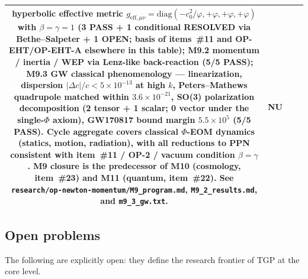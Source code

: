 \documentclass[11pt,a4paper]{article}
\renewcommand{\Phi}{\varPhi}
\begin{document}
\begin{center}
\begin{longtable}{@{}clp{7.2cm}c@{}}
    hyperbolic effective metric $g_{\mathrm{eff},\mu\nu} =
    \mathrm{diag}(-c_{0}^{2}/\varphi, +\varphi, +\varphi, +\varphi)$
    with $\beta = \gamma = 1$ (3 PASS + 1 conditional RESOLVED via
    Bethe--Salpeter + 1 OPEN; basis of items~\#11 and OP-EHT/OP-EHT-A
    elsewhere in this table); M9.2 momentum / inertia / WEP via
    Lenz-like back-reaction (5/5 PASS); M9.3 GW classical
    phenomenology --- linearization, dispersion $|\Delta c|/c <
    5\times 10^{-13}$ at high $k$, Peters--Mathews quadrupole
    matched within $3.6\times 10^{-21}$, SO(3) polarization
    decomposition (2 tensor + 1 scalar; 0 vector under the
    single-$\Phi$ axiom), GW170817 bound margin $5.5\times 10^{5}$
    (5/5 PASS). Cycle aggregate covers classical $\Phi$-EOM dynamics
    (statics, motion, radiation), with all reductions to PPN
    consistent with item~\#11 / OP-2 / vacuum condition $\beta=\gamma$.
    M9 closure is the predecessor of M10 (cosmology, item~\#23) and
    M11 (quantum, item~\#22). See
    \texttt{research/op-newton-momentum/M9\_program.md},
    \texttt{M9\_2\_results.md}, and \texttt{m9\_3\_gw.txt}.
  & \textsf{NU}\\
\bottomrule
\end{longtable}
\end{center}

\subsection{Open problems}

The following are explicitly open: they define the research frontier of
TGP at the core level.
\end{document}
